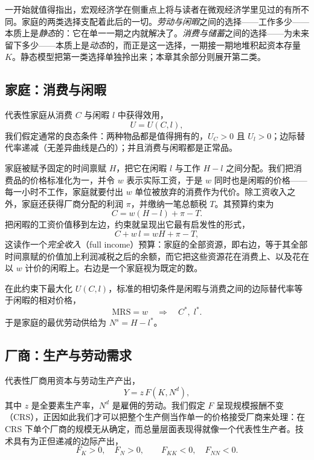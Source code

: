 一开始就值得指出，宏观经济学在侧重点上将与读者在微观经济学里见过的有所不同。家庭的两类选择支配着此后的一切。\emph{劳动与闲暇}之间的选择——工作多少——本质上是\emph{静态}的：它在单一一期之内就解决了。\emph{消费与储蓄}之间的选择——为未来留下多少——本质上是\emph{动态}的，而正是这一选择，一期接一期地堆积起资本存量 $K$。静态模型把第一类选择单独拎出来；本章其余部分则展开第二类。

\subsection{家庭：消费与闲暇}

代表性家庭从消费 $C$ 与闲暇 $l$ 中获得效用，
\[
U = U(C, l),
\]
我们假定通常的良态条件：两种物品都是值得拥有的，$U_C > 0$ 且 $U_l > 0$；边际替代率递减（无差异曲线是凸的）；并且消费与闲暇都是正常品。

家庭被赋予固定的时间禀赋 $H$，把它在闲暇 $l$ 与工作 $H - l$ 之间分配。我们把消费品的价格标准化为一，并令 $w$ 表示实际工资，于是 $w$ 同时也是闲暇的价格——每一小时不工作，家庭就要付出 $w$ 单位被放弃的消费作为代价。除工资收入之外，家庭还获得厂商分配的利润 $\pi$，并缴纳一笔总额税 $T$。其预算约束为
\[
C = w(H - l) + \pi - T.
\]
把闲暇的工资价值移到左边，约束就呈现出它最有启发性的形式，
\[
C + w\,l = wH + \pi - T,
\]
这读作一个\emph{完全收入}（full income）预算：家庭的全部资源，即右边，等于其全部时间禀赋的价值加上利润减税之后的余额，而它把这些资源花在消费上、以及花在以 $w$ 计价的闲暇上。右边是一个家庭视为既定的数。

在此约束下最大化 $U(C,l)$，标准的相切条件是闲暇与消费之间的边际替代率等于闲暇的相对价格，
\[
\mathrm{MRS} = w \quad\Longrightarrow\quad C^*,\; l^*.
\]
于是家庭的最优劳动供给为 $N^s = H - l^*$。

\subsection{厂商：生产与劳动需求}

代表性厂商用资本与劳动生产产出，
\[
Y = z\,F(K, N^d),
\]
其中 $z$ 是全要素生产率，$N^d$ 是雇佣的劳动。我们假定 $F$ 呈现规模报酬不变（CRS），正因如此我们才可以把整个生产侧当作单一的价格接受厂商来处理：在 CRS 下单个厂商的规模无从确定，而总量层面表现得就像一个代表性生产者。技术具有为正但递减的边际产出，
\[
F_K > 0, \quad F_N > 0, \qquad F_{KK} < 0, \quad F_{NN} < 0.
\]



